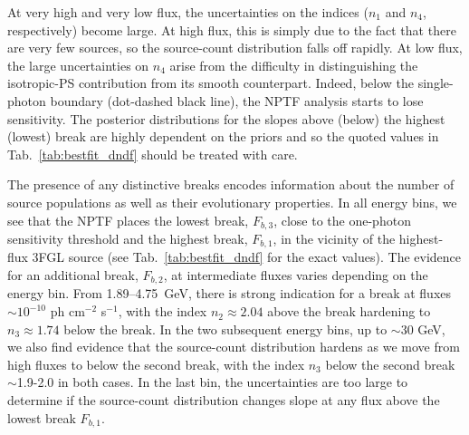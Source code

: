 At very high and very low flux, the uncertainties on the indices ($n_1$ and $n_4$, respectively) become large.  At high flux, this is simply due to the fact that there are very few sources, so the source-count distribution falls off rapidly.  At low flux, the large uncertainties on $n_4$ arise from the difficulty in distinguishing the isotropic-PS contribution from its smooth counterpart.  Indeed, below the single-photon boundary (dot-dashed black line), the NPTF analysis starts to lose sensitivity.  The posterior distributions for the slopes above (below) the highest (lowest) break are highly dependent on the priors and so the quoted values in Tab.~\ref{tab:bestfit_dndf} should be treated with care.

The presence of any distinctive breaks encodes information about the number of source populations as well as their evolutionary properties.  In all energy bins, we see that the NPTF places the lowest break, $F_{b,3}$, close to the one-photon sensitivity threshold and the highest break, $F_{b,1}$, in the vicinity of the highest-flux 3FGL source (see Tab.~\ref{tab:bestfit_dndf} for the exact values).  The evidence for an additional break, $F_{b,2}$, at intermediate fluxes  varies depending on the energy bin.  From 1.89--4.75~GeV, there is strong indication for a break at fluxes $\sim$$10^{-10}$ ph cm$^{-2}$ s$^{-1}$, with the index $n_2 \approx 2.04$ above the break hardening to $n_3 \approx 1.74$ below the break.  In the two subsequent energy bins, up to $\sim$$30$ GeV, we also find evidence that the source-count distribution hardens as we move from high fluxes to below the second break, with the index $n_3$ below the second break $\sim$1.9-2.0 in both cases.
  In the last bin, the uncertainties are too large to determine if the source-count distribution changes slope at any flux above the lowest break $F_{b,1}$.


